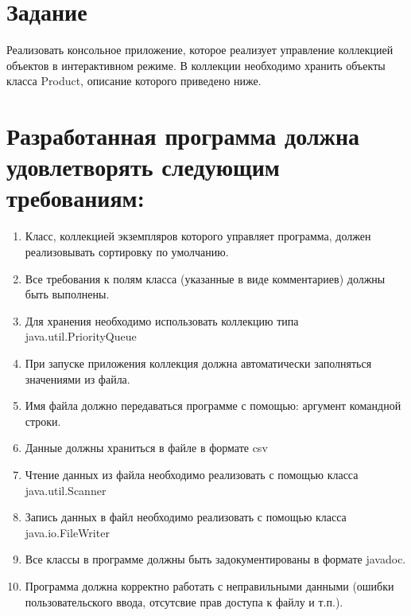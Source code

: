 \documentclass{article}
\begin{document}
\itmo[
  variant=74273,
  labn=5,
  discipline=Программирование,
  group=P3115,
  student=Владимир Мацюк,
  teacher=Кустарев Иван Павлович,
  year=2023,
  logo=../../../lib/img/itmo.png
]

\section*{Задание}

Реализовать консольное приложение, которое реализует управление коллекцией объектов в интерактивном режиме. В коллекции необходимо хранить объекты класса Product, описание которого приведено ниже.

\section*{Разработанная программа должна удовлетворять следующим требованиям:}
\begin{enumerate}
  \item Класс, коллекцией экземпляров которого управляет программа, должен реализовывать сортировку по умолчанию.
  \item Все требования к полям класса (указанные в виде комментариев) должны быть выполнены.
  \item Для хранения необходимо использовать коллекцию типа java.util.PriorityQueue
  \item При запуске приложения коллекция должна автоматически заполняться значениями из файла.
  \item Имя файла должно передаваться программе с помощью: аргумент командной строки.
  \item Данные должны храниться в файле в формате csv
  \item Чтение данных из файла необходимо реализовать с помощью класса java.util.Scanner
  \item Запись данных в файл необходимо реализовать с помощью класса java.io.FileWriter
  \item Все классы в программе должны быть задокументированы в формате javadoc.
  \item Программа должна корректно работать с неправильными данными (ошибки пользовательского ввода, отсутсвие прав доступа к файлу и т.п.).
\end{enumerate}
\end{document}
